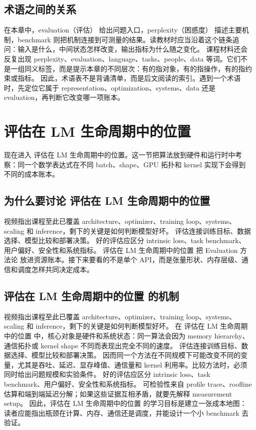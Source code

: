 \documentclass[a4paper]{article}
\begin{document}
\subsection{术语之间的关系}
在本章中，evaluation（评估） 给出问题入口，perplexity（困惑度） 描述主要机制，benchmark 则把机制连接到可测量的结果。读教材时应当沿着这个链条追问：输入是什么，中间状态怎样改变，输出指标为什么随之变化。
课程材料还会反复出现 perplexity、evaluation、language、tasks、people、data 等词。它们不是一组同义标签，而是提示本章的不同层次：有的指对象，有的指操作，有的指约束或指标。
因此，术语表不是背诵清单，而是后文阅读的索引。遇到一个术语时，先定位它属于 representation、optimization、systems、data 还是 evaluation，再判断它改变哪一项账本。
\section{评估在 LM 生命周期中的位置}
现在进入 评估在 LM 生命周期中的位置。这一节把算法放到硬件和运行时中考察：同一个数学表达式在不同 batch、shape、GPU 拓扑和 kernel 实现下会得到不同的成本账本。
\subsection{为什么要讨论 评估在 LM 生命周期中的位置}
视频指出课程至此已覆盖 architecture、optimizer、training loop、systems、scaling 和 inference，剩下的关键是如何判断模型好坏。
评估连接训练目标、数据选择、模型比较和部署决策。
好的评估应区分 intrinsic loss、task benchmark、用户偏好、安全性和系统指标。
评估在 LM 生命周期中的位置 把 Evaluation 方法论 放进资源账本。接下来要看的不是单个 API，而是张量形状、内存层级、通信和调度怎样共同决定成本。
\subsection{评估在 LM 生命周期中的位置 的机制}
视频指出课程至此已覆盖 architecture、optimizer、training loop、systems、scaling 和 inference，剩下的关键是如何判断模型好坏。 在 评估在 LM 生命周期中的位置 中，核心对象是硬件和系统状态：同一算法会因为 memory hierarchy、通信拓扑或 kernel shape 不同而表现出完全不同的速度。
评估连接训练目标、数据选择、模型比较和部署决策。 因而同一个方法在不同规模下可能改变不同的变量，尤其是吞吐、延迟、显存峰值、通信量和 kernel 利用率。比较方法时，必须同时给出问题规模和实验条件。
好的评估应区分 intrinsic loss、task benchmark、用户偏好、安全性和系统指标。 可检验性来自 profile trace、roofline 估算和端到端延迟分解；如果这些证据互相矛盾，就要先解释 measurement setup。
因此，评估在 LM 生命周期中的位置 的学习目标是建立一张成本地图：读者应能指出瓶颈在计算、内存、通信还是调度，并能设计一个小 benchmark 去验证。
\end{document}
